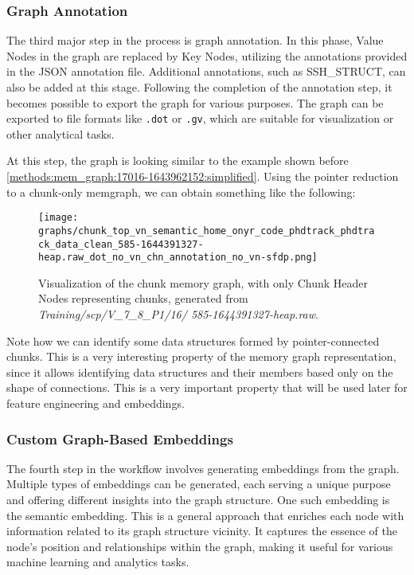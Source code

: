 \subsubsection{Graph Annotation}

The third major step in the process is graph annotation. In this phase, Value Nodes in the graph are replaced by Key Nodes, utilizing the annotations provided in the JSON annotation file. Additional annotations, such as SSH\_STRUCT, can also be added at this stage. Following the completion of the annotation step, it becomes possible to export the graph for various purposes. The graph can be exported to file formats like \texttt{.dot} or \texttt{.gv}, which are suitable for visualization or other analytical tasks.

At this step, the graph is looking similar to the example shown before \ref{methods:mem_graph:17016-1643962152:simplified}. Using the pointer reduction to a chunk-only \gls{memgraph}, we can obtain something like the following:

\begin{figure}[H]\label{methods:mem_graph:585-1644391327:chunk_only}
    \centering
    \texttt{[image: graphs/chunk\_top\_vn\_semantic\_home\_onyr\_code\_phdtrack\_phdtrack\_data\_clean\_585-1644391327-heap.raw\_dot\_no\_vn\_chn\_annotation\_no\_vn-sfdp.png]}
    \caption{Visualization of the chunk memory graph, with only Chunk Header Nodes representing chunks, generated from \textit{Training/scp/V\_7\_8\_P1/16/
    585-1644391327-heap.raw}.}
\end{figure}

Note how we can identify some data structures formed by pointer-connected chunks. This is a very interesting property of the memory graph representation, since it allows identifying data structures and their members based only on the shape of connections. This is a very important property that will be used later for feature engineering and embeddings. 

\subsubsection{Custom Graph-Based Embeddings}

The fourth step in the workflow involves generating embeddings from the graph. Multiple types of embeddings can be generated, each serving a unique purpose and offering different insights into the graph structure. One such embedding is the semantic embedding. This is a general approach that enriches each node with information related to its graph structure vicinity. It captures the essence of the node's position and relationships within the graph, making it useful for various machine learning and analytics tasks.

